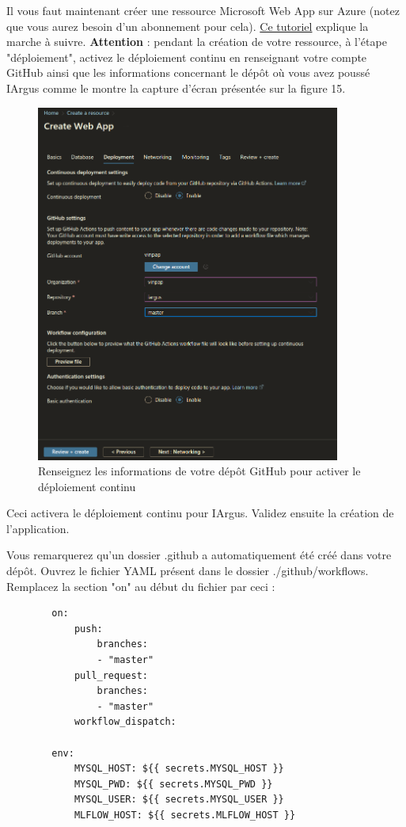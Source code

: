 \documentclass[french]{article}
\begin{document}
    Il vous faut maintenant créer une ressource Microsoft Web App sur Azure (notez que vous aurez besoin d'un abonnement pour cela). \href{https://www.scholarhat.com/tutorial/azure/creating-web-app-tutorial-pricing}{Ce tutoriel} explique la marche à suivre. \textbf{Attention} : pendant la création de votre ressource, à l'étape "déploiement", activez le déploiement continu en renseignant votre compte GitHub ainsi que les informations concernant le dépôt où vous avez poussé IArgus comme le montre la capture d'écran présentée sur la figure 15.

    \begin{figure}[h]
        \includegraphics[width=10cm]{azure}
        \centering
        \caption{Renseignez les informations de votre dépôt GitHub pour activer le déploiement continu}
    \end{figure}

    Ceci activera le déploiement continu pour IArgus. Validez ensuite la création de l'application.

    Vous remarquerez qu'un dossier .github a automatiquement été créé dans votre dépôt. Ouvrez le fichier YAML présent dans le dossier ./github/workflows. Remplacez la section "on" au début du fichier par ceci :
    \begin{verbatim}
        on:
            push:
                branches:
                - "master"
            pull_request:
                branches:
                - "master"
            workflow_dispatch:

        env: 
            MYSQL_HOST: ${{ secrets.MYSQL_HOST }}
            MYSQL_PWD: ${{ secrets.MYSQL_PWD }}
            MYSQL_USER: ${{ secrets.MYSQL_USER }}
            MLFLOW_HOST: ${{ secrets.MLFLOW_HOST }}
    \end{verbatim}
\end{document}
